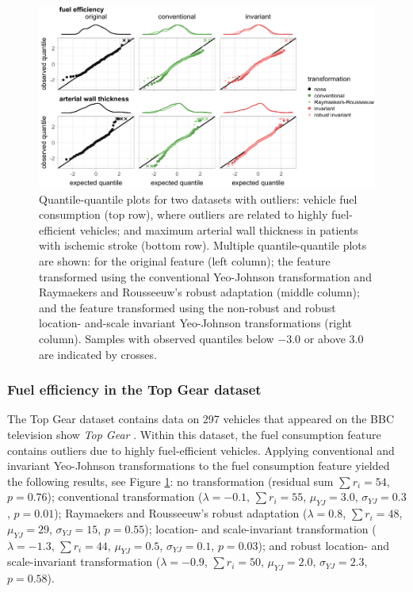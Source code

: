 \documentclass[preprint,12pt,authoryear]{elsarticle}
\begin{document}
\begin{figure}

{\centering \includegraphics[width=1\linewidth]{figure_9} 

}

\caption{Quantile-quantile plots for two datasets with outliers: vehicle fuel consumption (top row), where outliers are related to highly fuel-efficient vehicles; and maximum arterial wall thickness in patients with ischemic stroke (bottom row). Multiple quantile-quantile plots are shown: for the original feature (left column); the feature transformed using the conventional Yeo-Johnson transformation and Raymaekers and Rousseeuw's robust adaptation (middle column); and the feature transformed using the non-robust and robust location- and-scale invariant Yeo-Johnson transformations (right column). Samples with observed quantiles below $-3.0$ or above $3.0$ are indicated by crosses.}\label{fig:experimental-results-outlier-robustness}
\end{figure}

\subsubsection{Fuel efficiency in the Top Gear
dataset}\label{sec:fuel-efficiency-in-the-top-gear-dataset}

The Top Gear dataset contains data on 297 vehicles that appeared on the
BBC television show \emph{Top Gear} \citep{Alfons2021-kc}. Within this dataset,
the fuel consumption feature contains outliers due to highly
fuel-efficient vehicles. Applying conventional and invariant Yeo-Johnson
transformations to the fuel consumption feature yielded the following
results, see Figure \ref{fig:experimental-results-outlier-robustness}:
no transformation (residual sum \(\sum r_i = 54\), \(p=0.76\));
conventional transformation (\(\lambda = -0.1\), \(\sum r_i = 55\),
\(\mu_{YJ} = 3.0\), \(\sigma_{YJ} = 0.3\), \(p=0.01\)); Raymaekers and
Rousseeuw's robust adaptation (\(\lambda = 0.8\), \(\sum r_i = 48\),
\(\mu_{YJ} = 29\), \(\sigma_{YJ} = 15\), \(p=0.55\)); location- and
scale-invariant transformation (\(\lambda = -1.3\), \(\sum r_i = 44\),
\(\mu_{YJ} = 0.5\), \(\sigma_{YJ} = 0.1\), \(p=0.03\)); and robust
location- and scale-invariant transformation (\(\lambda = -0.9\),
\(\sum r_i = 50\), \(\mu_{YJ} = 2.0\), \(\sigma_{YJ} = 2.3\),
\(p=0.58\)).
\end{document}
